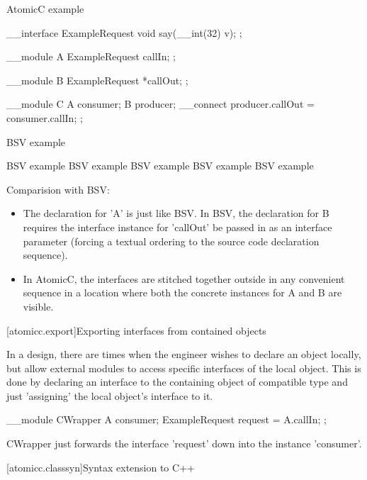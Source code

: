 \begin{example}
\begin{multicols}{2}
AtomicC example
\begin{codeblock}
     __interface ExampleRequest {
         void say(__int(32) v);
     };

     __module A {
          ExampleRequest callIn;
     };

     __module B {
         ExampleRequest *callOut;
     };

     __module C {
         A consumer;
         B producer;
         __connect producer.callOut = consumer.callIn;
     };
\end{codeblock}
\columnbreak
BSV example
\begin{codeblock}
    BSV example
    BSV example
    BSV example
    BSV example
    BSV example
\end{codeblock}
\end{multicols}
\end{example}

Comparision with BSV:
\begin{itemize}
\item The declaration for 'A' is just like BSV.
In BSV, the declaration for B requires the interface instance for 'callOut' be passed in as
an interface parameter (forcing a textual ordering to the source code
declaration sequence).
\item In AtomicC, the interfaces are stitched together outside in any
convenient sequence in a location where both the concrete instances
for A and B are visible.
\end{itemize}

[atomicc.export]{Exporting interfaces from contained objects}

In a design, there are times when the engineer wishes to declare an object locally,
but allow external modules to access specific interfaces of the local object.
This is done by declaring an interface to the containing object of compatible
type and just 'assigning' the local object's interface to it.

\begin{example}
\begin{codeblock}
     __module CWrapper {
         A consumer;
         ExampleRequest request = A.callIn;
      };
\end{codeblock}
\end{example}

CWrapper just forwards the interface 'request' down into the instance 'consumer'.

[atomicc.classsyn]{Syntax extension to C++}
\begin{bnf}
\br
     \br
     \br
\end{bnf}
